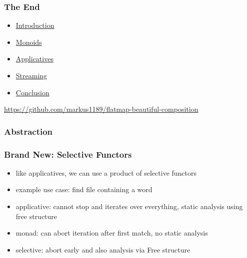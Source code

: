 \documentclass[aspectratio=169]{beamer}
\begin{document}
\begin{frame}
  \frametitle{The End}
  \begin{itemize}
  \item \hyperref[sec:introduction]{Introduction}
  \item \hyperref[sec:monoids]{Monoids}
  \item \hyperref[sec:applicatives]{Applicatives}
  \item \hyperref[sec:streaming]{Streaming}
  \item \hyperref[sec:conclusion]{Conclusion}
  \end{itemize}
  \vfill
  \begin{center}
    \url{https://github.com/markus1189/flatmap-beautiful-composition}
  \end{center}
\end{frame}

\appendix{}

\begin{frame}
  \frametitle{Abstraction}
\end{frame}

\begin{frame}
  \frametitle{Brand New: Selective Functors}
  \begin{itemize}
  \item like applicatives, we can use a product of selective functors
  \item example use case: find file containing a word
  \item applicative: cannot stop and iterates over everything, static analysis using free structure
  \item monad: can abort iteration after first match, no static analysis
  \item selective: abort early and also analysis via Free structure
  \end{itemize}
\end{frame}
\end{document}
